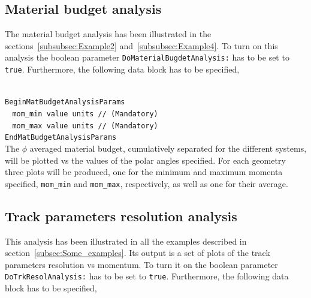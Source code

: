 \subsection{Material budget analysis}
\label{subsec:matbud_analysis}

The material budget analysis has been illustrated in the sections~\ref{subsubsec:Example2} and~\ref{subsubsec:Example4}. To turn on this analysis the boolean parameter {\tt DoMaterialBugdetAnalysis:} has 
to be set to {\tt true}. Furthermore, the following data block has to be specified,

~\\
\noindent
{\tt BeginMatBudgetAnalysisParams} \\
$~~~~${\tt mom\_min    value units    // (Mandatory)} \\
$~~~~${\tt mom\_max    value units    // (Mandatory)} \\
{\tt EndMatBudgetAnalysisParams} \\


\noindent
The $\phi$ averaged material budget, cumulatively separated for the different systems, will be plotted vs the values of the polar angles specified. For each geometry three plots will be 
produced, one for the minimum and maximum momenta specified, {\tt mom\_min} and {\tt mom\_max}, respectively, as well as one for their average.

\subsection{Track parameters resolution analysis}
\label{subsec:trkResol_analysis}

This analysis has been illustrated in all the examples described in section~\ref{subsec:Some_examples}. Its output is a set of plots of the track parameters resolution vs momentum. To turn it on the 
boolean parameter {\tt DoTrkResolAnalysis:} has to be set to {\tt true}. Furthermore, the following data block has to be specified,

